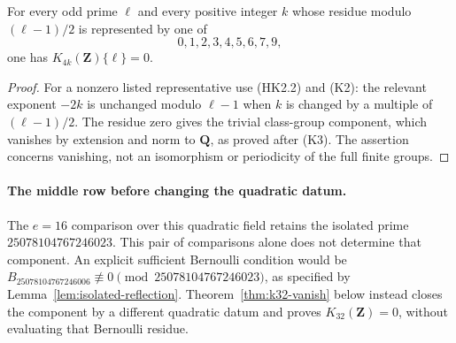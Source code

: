 \begin{corollary}
\label{cor:eight-degrees-period}
For every odd prime $\ell$ and every positive integer $k$ whose residue
modulo $(\ell-1)/2$ is represented by one of
\[
                              0,1,2,3,4,5,6,7,9,
\]
one has $K_{4k}(\mathbf Z)\{\ell\}=0$.
\end{corollary}

\begin{proof}
For a nonzero listed representative use (HK2.2) and (K2):
the relevant exponent $-2k$ is unchanged modulo $\ell-1$ when $k$
is changed by a multiple of $(\ell-1)/2$.
The residue zero gives the trivial class-group component, which
vanishes by extension and norm to $\mathbf Q$, as proved after (K3).
The assertion concerns vanishing, not an isomorphism or periodicity
of the full finite groups.
\end{proof}

\paragraph{The middle row before changing the quadratic datum.}
The $e=16$ comparison over this quadratic field retains the isolated prime
$25078104767246023$.
This pair of comparisons alone does not determine that component.
An explicit sufficient Bernoulli condition would be
$B_{25078104767246006}\not\equiv0
 \pmod{25078104767246023}$, as specified by
Lemma~\ref{lem:isolated-reflection}. Theorem~\ref{thm:k32-vanish}
below instead closes the component by a different quadratic datum
and proves $K_{32}(\mathbf Z)=0$, without evaluating that Bernoulli
residue.
